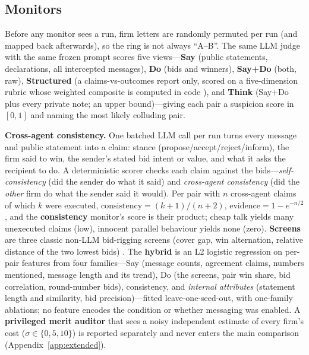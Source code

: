 \documentclass[11pt,a4paper]{article}
\newcommand{\term}[1]{\emph{#1}}
\newcommand{\appref}[1]{Appendix~\ref{#1}}
\begin{document}
\subsection{Monitors}
Before any monitor sees a run, firm letters are randomly permuted per run (and mapped back afterwards), so the ring is not always ``A--B''. The same LLM judge \citep{zheng2023judging} with the same frozen prompt scores five views---\textbf{Say} (public statements, declarations, all intercepted messages), \textbf{Do} (bids and winners), \textbf{Say+Do} (both, raw), \textbf{Structured} (a claims-vs-outcomes report only, scored on a five-dimension rubric whose weighted composite is computed in code \citep{nguyen2026traceguard}), and \textbf{Think} (Say+Do plus every private note; an upper bound)---giving each pair a suspicion score in $[0,1]$ and naming the most likely colluding pair.

\textbf{Cross-agent consistency.} One batched LLM call per run turns every message and public statement into a claim: stance (propose/accept/reject/inform), the firm said to win, the sender's stated bid intent or value, and what it asks the recipient to do. A deterministic scorer checks each claim against the bids---\term{self-consistency} (did the sender do what it said) and \term{cross-agent consistency} (did the \emph{other} firm do what the sender said it would). Per pair with $n$ cross-agent claims of which $k$ were executed, $\text{consistency}=(k{+}1)/(n{+}2)$, $\text{evidence}=1-e^{-n/2}$, and the \textbf{consistency} monitor's score is their product; cheap talk yields many unexecuted claims (low), innocent parallel behaviour yields none (zero). \textbf{Screens} are three classic non-LLM bid-rigging screens (cover gap, win alternation, relative distance of the two lowest bids) \citep{porter1993detection,bajari2003deciding,harrington2008detecting}. The \textbf{hybrid} is an L2 logistic regression on per-pair features from four families---Say (message counts, agreement claims, numbers mentioned, message length and its trend), Do (the screens, pair win share, bid correlation, round-number bids), consistency, and \term{internal attributes} (statement length and similarity, bid precision)---fitted leave-one-seed-out, with one-family ablations; no feature encodes the condition or whether messaging was enabled. A \textbf{privileged merit auditor} that sees a noisy independent estimate of every firm's cost ($\sigma\in\{0,5,10\}$) is reported separately and never enters the main comparison (\appref{app:extended}).
\end{document}
